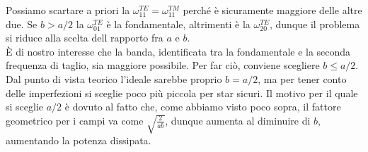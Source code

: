 \documentclass{book}
\begin{document}
    Possiamo scartare a priori la $\omega_{11} ^{TE}=\omega_{11} ^{TM}$ perché è sicuramente maggiore delle altre due. Se $b > a/2$ la $\omega_{01} ^{TE}$ è la fondamentale,
    altrimenti è la $\omega_{20} ^{TE}$, dunque il problema si riduce alla scelta dell rapporto fra $a$ e $b$. \\
    È di nostro interesse che la banda, identificata tra la fondamentale e la seconda frequenza di taglio, sia maggiore possibile. Per far ciò, conviene scegliere $b \leq a/2$. Dal punto di vista teorico l'ideale 
    sarebbe proprio $b=a/2$, ma per tener conto delle imperfezioni si sceglie poco più piccola per star sicuri. Il motivo per il quale si sceglie $a/2$ è dovuto al fatto che, come abbiamo visto poco sopra, il fattore geometrico 
    per i campi va come $\sqrt{\frac{2}{ab}}$, dunque aumenta al diminuire di $b$, aumentando la potenza dissipata.
\end{document}
